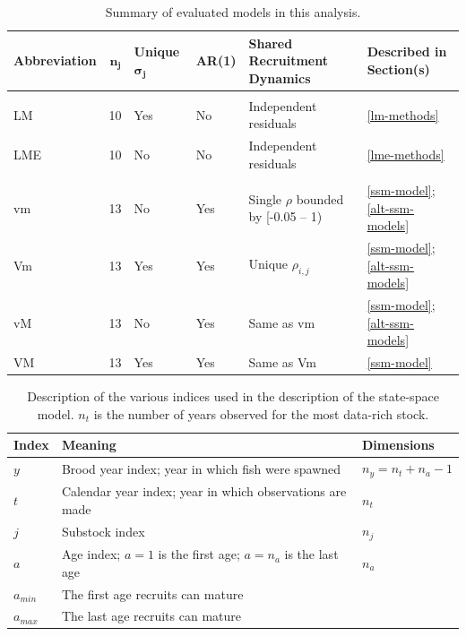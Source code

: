 \documentclass[12pt,]{book}
\theoremstyle{definition}
\theoremstyle{definition}
\theoremstyle{definition}
\theoremstyle{remark}
\begin{document}
\begin{landscape}\begin{table}

\caption{\label{tab:models-table}Summary of evaluated models in this analysis.}
\centering
\begin{tabular}[t]{lrllll}
\toprule
\textbf{Abbreviation} & $\boldsymbol{n_j}$ & \textbf{Unique} $\boldsymbol{\sigma_j}$ & \textbf{AR(1)} & \textbf{Shared Recruitment Dynamics} & \textbf{Described in Section(s)}\\
\midrule
\addlinespace[0.3em]
\multicolumn{6}{l}{\textbf{Regression-Based Models}}\\
\hspace{1em}LM & 10 & Yes & No & Independent residuals & \ref{lm-methods}\\
\hspace{1em}LME & 10 & No & No & Independent residuals & \ref{lme-methods}\\
\addlinespace[0.3em]
\multicolumn{6}{l}{\textbf{State-Space Models}}\\
\hspace{1em}vm & 13 & No & Yes & Single $\rho$ bounded by [-0.05 -- 1) & \ref{ssm-model}; \ref{alt-ssm-models}\\
\hspace{1em}Vm & 13 & Yes & Yes & Unique $\rho_{i,j}$ & \ref{ssm-model}; \ref{alt-ssm-models}\\
\hspace{1em}vM & 13 & No & Yes & Same as vm & \ref{ssm-model}; \ref{alt-ssm-models}\\
\hspace{1em}VM & 13 & Yes & Yes & Same as Vm & \ref{ssm-model}\\
\bottomrule
\end{tabular}
\end{table}
\end{landscape}

\clearpage

\begin{table}

\caption{\label{tab:ch4-notation-table}Description of the various indices used in the description of the state-space model. $n_t$ is the number of years observed for the most data-rich stock.}
\centering
\begin{tabular}[t]{l>{\raggedright\arraybackslash}p{25em}>{\raggedright\arraybackslash}p{10em}}
\toprule
\textbf{Index} & \textbf{Meaning} & \textbf{Dimensions}\\
\midrule
$y$ & Brood year index; year in which fish were spawned & $n_y=n_t + n_a - 1$\\
$t$ & Calendar year index; year in which observations are made & $n_t$\\
$j$ & Substock index & $n_j$\\
$a$ & Age index; $a=1$ is the first age; $a=n_a$ is the last age & $n_a$\\
$a_{min}$ & The first age recruits can mature & 1\\
$a_{max}$ & The last age recruits can mature & 1\\
\bottomrule
\end{tabular}
\end{table}
\end{document}
